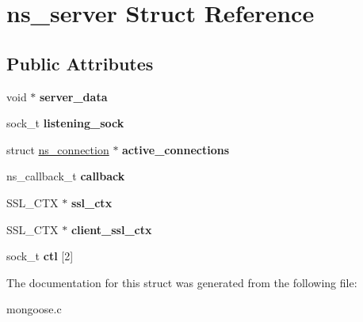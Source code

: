 \hypertarget{structns__server}{\section{ns\-\_\-server Struct Reference}
\label{structns__server}
}
\subsection*{Public Attributes}
\begin{DoxyCompactItemize}
\item 
\hypertarget{structns__server_af55726087166f7d03aeddc2ba48f2771}{void $\ast$ {\bfseries server\-\_\-data}}\label{structns__server_af55726087166f7d03aeddc2ba48f2771}

\item 
\hypertarget{structns__server_a2f7aebbeb675d926e9261b1f4cd483ec}{sock\-\_\-t {\bfseries listening\-\_\-sock}}\label{structns__server_a2f7aebbeb675d926e9261b1f4cd483ec}

\item 
\hypertarget{structns__server_aa9e4b475a57bb564fd1584584d2a884e}{struct \hyperlink{structns__connection}{ns\-\_\-connection} $\ast$ {\bfseries active\-\_\-connections}}\label{structns__server_aa9e4b475a57bb564fd1584584d2a884e}

\item 
\hypertarget{structns__server_a841af0d6bb158cd8d171ef4fefb05b71}{ns\-\_\-callback\-\_\-t {\bfseries callback}}\label{structns__server_a841af0d6bb158cd8d171ef4fefb05b71}

\item 
\hypertarget{structns__server_a78c0cc9b40b7dc65849f1978c2e52bd7}{S\-S\-L\-\_\-\-C\-T\-X $\ast$ {\bfseries ssl\-\_\-ctx}}\label{structns__server_a78c0cc9b40b7dc65849f1978c2e52bd7}

\item 
\hypertarget{structns__server_a2986e2d7c46e9f549b9f0155740b5890}{S\-S\-L\-\_\-\-C\-T\-X $\ast$ {\bfseries client\-\_\-ssl\-\_\-ctx}}\label{structns__server_a2986e2d7c46e9f549b9f0155740b5890}

\item 
\hypertarget{structns__server_a7c5be118c1ba0a6ee49ee783ce2054a3}{sock\-\_\-t {\bfseries ctl} \mbox{[}2\mbox{]}}\label{structns__server_a7c5be118c1ba0a6ee49ee783ce2054a3}

\end{DoxyCompactItemize}


The documentation for this struct was generated from the following file\-:\begin{DoxyCompactItemize}
\item 
mongoose.\-c\end{DoxyCompactItemize}
